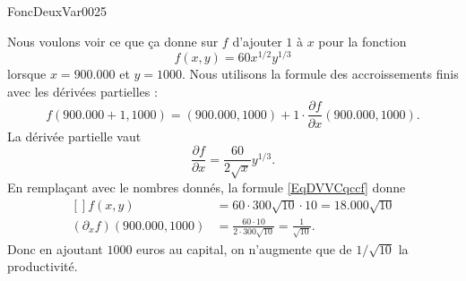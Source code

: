 
\begin{corrige}{FoncDeuxVar0025}

	Nous voulons voir ce que ça donne sur $f$  d'ajouter $1$ à $x$ pour la fonction
	\begin{equation}
		f(x,y)=60x^{1/2}y^{1/3}
	\end{equation}
	lorsque $x=900.000$ et $y=1000$. Nous utilisons la formule des accroissements finis avec les dérivées partielles :
	\begin{equation}		\label{EqDVVCqccf}
		f(900.000+1,1000)=(900.000,1000)+1\cdot\frac{ \partial f }{ \partial x }(900.000,1000).
	\end{equation}
	La dérivée partielle vaut
	\begin{equation}
		\frac{ \partial f }{ \partial x }=\frac{ 60 }{ 2\sqrt{x} }y^{1/3}.
	\end{equation}
	En remplaçant avec le nombres donnés, la formule \eqref{EqDVVCqccf} donne
	\begin{equation}
		\begin{aligned}[]
			f(x,y)&=60\cdot 300\sqrt{10}\cdot 10=18.000\sqrt{10}\\
			(\partial_xf)(900.000,1000)&=\frac{ 60\cdot 10 }{ 2\cdot 300\sqrt{10} }=\frac{1}{ \sqrt{10} }.
		\end{aligned}
	\end{equation}
	Donc en ajoutant $1000$ euros au capital, on n'augmente que de $1/\sqrt{10}$ la productivité.


\end{corrige}
